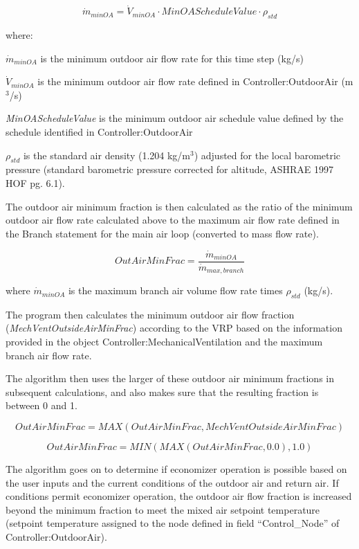 \begin{equation}
\dot{m}_{minOA} = \dot{V}_{minOA} \cdot MinOAScheduleValue \cdot {\rho_{std}}
\end{equation}

where:

\({\dot{m}_{minOA}}\) is the minimum outdoor air flow rate for this time step (kg/s)

\({\dot{V}_{minOA}}\) is the minimum outdoor air flow rate defined in Controller:OutdoorAir (m\(^{3}\)/s)

\emph{MinOAScheduleValue} is the minimum outdoor air schedule value defined by the schedule identified in Controller:OutdoorAir

\({\rho_{std}}\) is the standard air density (1.204 kg/m\(^{3}\)) adjusted for the local barometric pressure (standard barometric pressure corrected for altitude, ASHRAE 1997 HOF pg. 6.1).

The outdoor air minimum fraction is then calculated as the ratio of the minimum outdoor air flow rate calculated above to the maximum air flow rate defined in the Branch statement for the main air loop (converted to mass flow rate).

\begin{equation}
  OutAirMinFrac = \frac{\dot{m}_{minOA}}{\dot{m}_{max,branch}}
\end{equation}

where \({\dot{m}_{minOA}}\) is the maximum branch air volume flow rate times \(\rho_{std}\) (kg/s).

The program then calculates the minimum outdoor air flow fraction (\emph{MechVentOutsideAirMinFrac}) according to the VRP based on the information provided in the object Controller:MechanicalVentilation and the maximum branch air flow rate.

The algorithm then uses the larger of these outdoor air minimum fractions in subsequent calculations, and also makes sure that the resulting fraction is between 0 and 1.

\begin{equation}
OutAirMinFrac = MAX\left( {OutAirMinFrac,MechVentOutsideAirMinFrac} \right)
\end{equation}

\begin{equation}
OutAirMinFrac = MIN\left( {MAX\left( {OutAirMinFrac,0.0} \right),1.0} \right)
\end{equation}

The algorithm goes on to determine if economizer operation is possible based on the user inputs and the current conditions of the outdoor air and return air. If conditions permit economizer operation, the outdoor air flow fraction is increased beyond the minimum fraction to meet the mixed air setpoint temperature (setpoint temperature assigned to the node defined in field ``Control\_Node'' of Controller:OutdoorAir).

